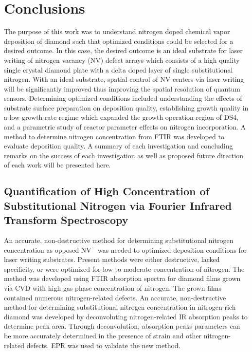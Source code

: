 \chapter{Conclusions}
\indent

The purpose of this work was to understand nitrogen doped chemical vapor deposition of diamond such that optimized conditions could be selected for a desired outcome. In this case, the desired outcome is an ideal substrate for laser writing of nitrogen vacancy (NV) defect arrays which consists of a high quality single crystal diamond plate with a delta doped layer of single substitutional nitrogen. With an ideal substrate, spatial control of NV centers via laser writing will be significantly improved thus improving the spatial resolution of quantum sensors. Determining optimized conditions included understanding the effects of substrate surface preparation on deposition quality, establishing growth quality in a low growth rate regime which expanded the growth operation region of DS4, and a parametric study of reactor parameter effects on nitrogen incorporation. A method to determine nitrogen concentration from FTIR was developed to evaluate deposition quality. A summary of each investigation and concluding remarks on the success of each investigation as well as proposed future direction of each work will be presented here.

\section{Quantification of High Concentration of Substitutional Nitrogen via Fourier Infrared Transform Spectroscopy}
\indent

An accurate, non-destructive method for determining substitutional nitrogen concentration as opposed NV$^-$ was needed to optimized deposition conditions for laser writing substrates. Present methods were either destructive, lacked specificity, or were optimized for low to moderate concentration of nitrogen. The method was developed using FTIR absorption spectra for diamond films grown via CVD with high gas phase concentration of nitrogen. The grown films contained numerous nitrogen-related defects. An accurate, non-destructive method for determining substitutional nitrogen concentration in nitrogen-rich diamond was developed by deconvoluting nitrogen-related IR absorption peaks to determine peak area. Through deconvolution, absorption peaks parameters can be more accurately determined in the presence of strain and other nitrogen-related defects. EPR was used to validate the new method.

